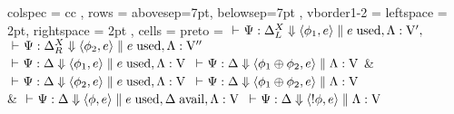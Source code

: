 \begin{tblr}{ colspec = { cc } 
	    , rows = {abovesep=7pt, belowsep=7pt}
	    , vborder{1-2} = { leftspace = 2pt, rightspace = 2pt } 
	    , cells = { preto = {\small} }
	    }
	\AX$\focus{\Psi}{\Delta_L^X}{\af{\phi_1}{e}} \fCenter \separator \constr{\used{e}, \Lambda}{\mathV'},$
	\noLine
	\UI$\focus{\Psi}{\Delta_R^X}{\af{\phi_2}{e}} \fCenter \separator \constr{\used{e}, \Lambda}{\mathV''}$
	\LeftLabel{\derRule{\displayten}}
	\DP
	\\ 
	\AX$\focus{\Psi}{\Delta}{\af{\phi_1}{e}} \fCenter \separator \constr{\used{e}, \Lambda}{\mathV}$
	\LeftLabel{\derRule{\displayplus[L]}}
	\UI$\focus{\Psi}{\Delta}{\af{\phi_1 \llplus \phi_2}{e}} \fCenter \separator \constr{\Lambda}{\mathV}$
	\DP
	&
	\AX$\focus{\Psi}{\Delta}{\af{\phi_2}{e}} \fCenter \separator \constr{\used{e}, \Lambda}{\mathV}$
	\LeftLabel{\derRule{\displayplus[R]}}
	\UI$\focus{\Psi}{\Delta}{\af{\phi_1 \llplus \phi_2}{e}} \fCenter \separator \constr{\Lambda}{\mathV}$
	\DP
	\\
	\LeftLabel{\derRule{\displayone}}
	\DP
	&
	\AX$\focus{\Psi}{\Delta}{\af{\phi}{e}} \fCenter \separator \constr{\used{e}, \avail{\Delta}, \Lambda }{\mathV}$
	\LeftLabel{\derRule{\displaybang}}
	\UI$\focus{\Psi}{\Delta}{\af{\llbang{\phi}}{e}} \fCenter \separator \constr{\Lambda}{\mathV}$
	\DP
	\\
	\LeftLabel{\derRule{\displaytoasy}}
	\DP
\end{tblr}
